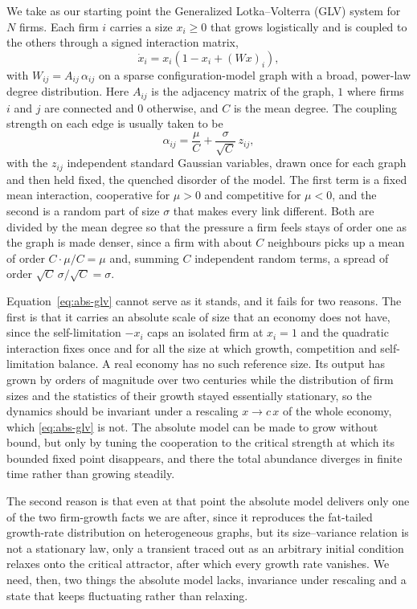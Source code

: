 We take as our starting point the Generalized Lotka--Volterra (GLV) system for $N$ firms. Each
firm $i$ carries a size $x_i \ge 0$ that grows logistically and is coupled to the others through a signed
interaction matrix,
\begin{equation}
    \dot{x}_i = x_i \left( 1 - x_i + (Wx)_i \right),
    \label{eq:abs-glv}
\end{equation}
with $W_{ij} = A_{ij}\,\alpha_{ij}$ on a sparse configuration-model graph with a broad, power-law
degree distribution. Here $A_{ij}$ is the
adjacency matrix of the graph, $1$ where firms $i$ and $j$ are connected and $0$ otherwise, and
$C$ is the mean degree. The coupling strength on each edge is usually taken to be
\begin{equation}
    \alpha_{ij} = \frac{\mu}{C} + \frac{\sigma}{\sqrt{C}}\,z_{ij},
    \label{eq:coupling-global}
\end{equation}
with the $z_{ij}$ independent standard Gaussian variables, drawn once for each graph and then held
fixed, the quenched disorder of the model. The first term is a fixed mean interaction, cooperative
for $\mu > 0$ and competitive for $\mu < 0$, and the second is a random part of size $\sigma$ that
makes every link different. Both are divided by the mean degree so that the pressure a firm feels
stays of order one as the graph is made denser, since a firm with about $C$ neighbours picks up a
mean of order $C \cdot \mu/C = \mu$ and, summing $C$ independent random terms, a spread of order
$\sqrt{C}\,\sigma/\sqrt{C} = \sigma$.

Equation~\eqref{eq:abs-glv} cannot serve as it stands, and it fails for two reasons. The first is
that it carries an absolute scale of size that an economy does not have, since the self-limitation
$-x_i$ caps an isolated firm at $x_i = 1$ and the quadratic interaction fixes once and for all the
size at which growth, competition and self-limitation balance. A real economy has no such
reference size. Its output has grown by orders of magnitude over two centuries while the
distribution of firm sizes and the statistics of their growth stayed essentially stationary, so
the dynamics should be invariant under a rescaling $x \to c\,x$ of the whole economy, which
\eqref{eq:abs-glv} is not. The absolute model can be made to grow without bound, but only by
tuning the cooperation to the critical strength at which its bounded fixed point disappears, and
there the total abundance diverges in finite time rather than growing steadily.

The second reason is that even at that point the absolute model delivers only one of the two
firm-growth facts we are after, since it reproduces the fat-tailed growth-rate distribution on
heterogeneous graphs, but its size--variance relation is not a stationary law, only a transient
traced out as an arbitrary initial condition relaxes onto the critical attractor, after which
every growth rate vanishes. We need, then, two things the absolute model lacks, invariance under
rescaling and a state that keeps fluctuating rather than relaxing.


